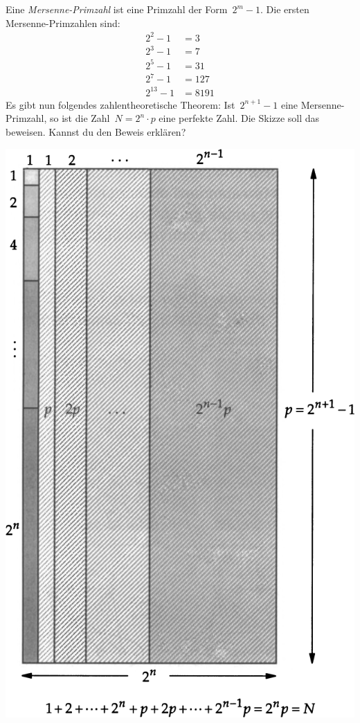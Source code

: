 \documentclass{../zirkelblatt}
\begin{document}
Eine \emph{Mersenne-Primzahl} ist eine Primzahl der Form~$2^m-1$. Die ersten
Mersenne-Primzahlen sind:
\begin{align*}
  2^2 - 1 &= 3 \\
  2^3 - 1 &= 7 \\
  2^5 - 1 &= 31 \\
  2^7 - 1 &= 127 \\
  2^{13} - 1 &= 8191
\end{align*}
Es gibt nun folgendes zahlentheoretische Theorem: Ist~$2^{n+1}-1$ eine
Mersenne-Primzahl, so ist die Zahl~$N = 2^n \cdot p$ eine perfekte Zahl. Die
Skizze soll das beweisen. Kannst du den Beweis erklären?
\begin{center}
\includegraphics[scale=0.5]{mersenne-perfekt}
\end{center}
\end{document}
